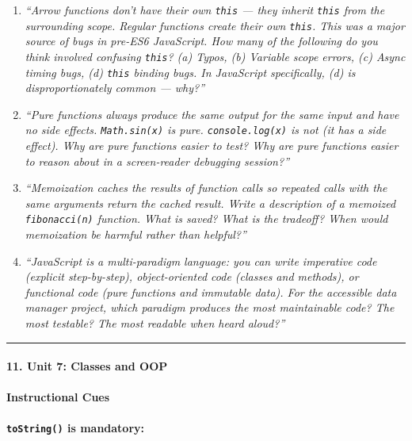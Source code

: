 \documentclass[
  justified,
  openright,
]{tufte-book}
\let\subsection\paragraph
\let\paragraph\paragraph
\let\subsection\paragraph
\let\paragraph\paragraph
\begin{document}
\begin{enumerate}
\def\labelenumi{\arabic{enumi}.}
\item
  \emph{``Arrow functions don't have their own \texttt{this} --- they
  inherit \texttt{this} from the surrounding scope. Regular functions
  create their own \texttt{this}. This was a major source of bugs in
  pre-ES6 JavaScript. How many of the following do you think involved
  confusing \texttt{this}? (a) Typos, (b) Variable scope errors, (c)
  Async timing bugs, (d) \texttt{this} binding bugs. In JavaScript
  specifically, (d) is disproportionately common --- why?''}
\item
  \emph{``Pure functions always produce the same output for the same
  input and have no side effects. \texttt{Math.sin(x)} is pure.
  \texttt{console.log(x)} is not (it has a side effect). Why are pure
  functions easier to test? Why are pure functions easier to reason
  about in a screen-reader debugging session?''}
\item
  \emph{``Memoization caches the results of function calls so repeated
  calls with the same arguments return the cached result. Write a
  description of a memoized \texttt{fibonacci(n)} function. What is
  saved? What is the tradeoff? When would memoization be harmful rather
  than helpful?''}
\item
  \emph{``JavaScript is a multi-paradigm language: you can write
  imperative code (explicit step-by-step), object-oriented code (classes
  and methods), or functional code (pure functions and immutable data).
  For the accessible data manager project, which paradigm produces the
  most maintainable code? The most testable? The most readable when
  heard aloud?''}
\end{enumerate}

\begin{center}\rule{0.5\linewidth}{0.5pt}\end{center}

\subsection{11. Unit 7: Classes and OOP}\label{unit-7-classes-and-oop}

\paragraph{Instructional Cues}\label{instructional-cues-18}

\textbf{\texttt{toString()} is mandatory:}
\end{document}
